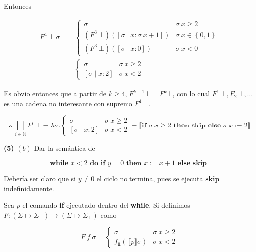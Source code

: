 \documentclass[article, 12pt]{article}
\begin{document}
Entonces

\begin{align*}
  F^4 ~ \bot ~ \sigma 
  &=\begin{cases}
    \sigma & \sigma ~ x \geq 2 \\ 
    (F^3 ~ \bot ) \left( [\sigma \mid x : \sigma ~ x + 1] \right) & \sigma ~ x \in \left\{
    0, 1 \right\} \\
      (F^3 ~ \bot ) \left( [\sigma \mid x : 0] \right) &\sigma ~ x < 0
  \end{cases} \\ 
  &=\begin{cases}
    \sigma & \sigma ~ x \geq 2 \\ 
    [\sigma \mid x : 2] & \sigma ~ x < 2
  \end{cases}
\end{align*}

Es obvio entonces que a partir de $k \geq 4$, $F^{k+1} \bot  = F^k \bot $, con
lo cual $F^1 ~ \bot, F_2 ~ \bot , \ldots$ es una cadena no interesante con
supremo $F^4 ~ \bot $.

\begin{equation*}
  \therefore ~ \bigsqcup_{i \in \mathbb{N}} F^{i} ~ \bot = \lambda \sigma. \begin{cases}
    \sigma & \sigma ~ x \geq 2 \\ 
    [\sigma \mid x : 2] & \sigma ~ x < 2
  \end{cases} = \llbracket \textbf{if } \sigma ~ x \geq 2 \textbf{ then }
  \textbf{skip} \textbf{ else } \sigma ~ x := 2 \rrbracket
\end{equation*}


\pagebreak

\begin{myframe}
  \textbf{(5)} $(b)$ Dar la semántica de 

  $$\textbf{while } x < 2 \textbf{ do } \textbf{if } y = 0 \textbf{ then } x :=
  x+1 \textbf{ else } \textbf{skip }$$
\end{myframe}

Debería ser claro que si $y \neq 0$ el ciclo no termina, pues se ejecuta
$\textbf{skip}$ indefinidamente. 

Sea $p$ el comando \textbf{if} ejecutado dentro del \textbf{while}. Si definimos $F : (\Sigma \mapsto \Sigma_\bot )
\mapsto (\Sigma \mapsto \Sigma_\bot )$ como 

\begin{equation*}
  F ~ f ~ \sigma = \begin{cases}
    \sigma & \sigma ~ x \geq 2 \\ 
    f_{\Bot} \left( ~ \llbracket p \rrbracket \sigma\right) & \sigma ~ x < 2
  \end{cases}
\end{equation*}
\end{document}
